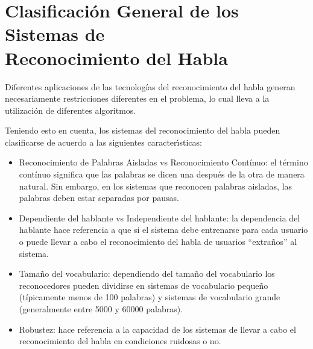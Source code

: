 \section[Clasificaci\'on General de los Sistemas de Reconocimiento del Habla]
{Clasificaci\'on General de los Sistemas de \\ Reconocimiento del Habla}

Diferentes aplicaciones de las tecnolog\'ias del reconocimiento del habla generan necesariamente 
restricciones diferentes en el problema, lo cual lleva a la utilizaci\'on de diferentes 
algoritmos\cite{Jurafsky}.

Teniendo esto en cuenta, los sistemas del reconocimiento del habla pueden clasificarse de acuerdo
a las siguientes caracter{\'\i}sticas:

\begin{itemize}
    \item Reconocimiento de Palabras Aisladas vs Reconocimiento Cont\'inuo: el t\'ermino cont\'inuo 
    significa que las palabras se dicen una despu\'es de la otra de manera natural. Sin embargo, en 
    los sistemas que reconocen palabras aisladas, las palabras deben estar separadas por pausas.
    \item Dependiente del hablante vs Independiente del hablante: la dependencia del hablante hace
    referencia a que si el sistema debe entrenarse para cada usuario o puede llevar a cabo el
    reconocimiento del habla de usuarios ``extra\~nos'' al sistema.
    \item Tama\~no del vocabulario: dependiendo del tama\~no del vocabulario los reconocedores pueden 
    dividirse en sistemas de vocabulario peque\~no (t\'ipicamente menos de 100 palabras) y sistemas de
    vocabulario grande (generalmente entre 5000 y 60000 palabras).
    \item Robustez: hace referencia a la capacidad de los sistemas de llevar a cabo el 
        reconocimiento del habla en condiciones ruidosas o no.
\end{itemize}